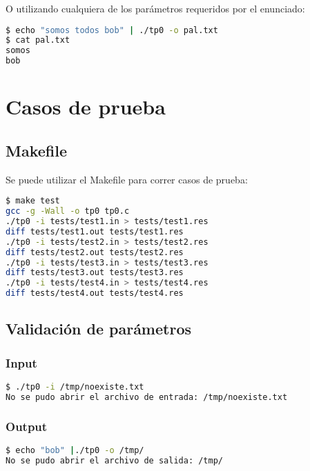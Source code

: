 \documentclass[10pt,a4paper]{article}
\begin{document}
O utilizando cualquiera de los parámetros requeridos por el enunciado:

\begin{lstlisting}[language=bash]
$ echo "somos todos bob" | ./tp0 -o pal.txt
$ cat pal.txt
somos
bob
\end{lstlisting}

\newpage

\section{Casos de prueba}

\subsection{Makefile}

Se puede utilizar el Makefile para correr casos de prueba:

\begin{lstlisting}[language=bash]
$ make test
gcc -g -Wall -o tp0 tp0.c 
./tp0 -i tests/test1.in > tests/test1.res
diff tests/test1.out tests/test1.res
./tp0 -i tests/test2.in > tests/test2.res
diff tests/test2.out tests/test2.res
./tp0 -i tests/test3.in > tests/test3.res
diff tests/test3.out tests/test3.res
./tp0 -i tests/test4.in > tests/test4.res
diff tests/test4.out tests/test4.res
\end{lstlisting}

\subsection{Validación de parámetros}

\subsubsection{Input}

\begin{lstlisting}[language=bash]
$ ./tp0 -i /tmp/noexiste.txt
No se pudo abrir el archivo de entrada: /tmp/noexiste.txt
\end{lstlisting}

\subsubsection{Output}

\begin{lstlisting}[language=bash]
$ echo "bob" |./tp0 -o /tmp/
No se pudo abrir el archivo de salida: /tmp/
\end{lstlisting}
\end{document}
